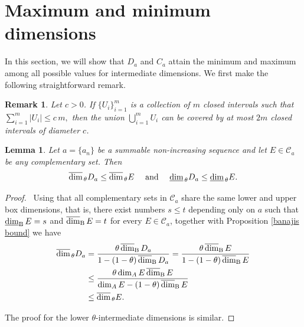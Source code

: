 \documentclass[11pt,reqno,bookmarksnumbered,raiselinks,breaklinks,colorlinks,plainpages]{amsart}
\newcommand\ubd{\overline{\mbox{\rm dim}}_{\rm B}\,} %
\newcommand\lbd{\underline{\mbox{\rm dim}}_{\rm B}\,} %
\newcommand\da{\underline{\mbox{\rm dim}}_{\,\theta}} %
\newcommand\uda{\overline{\mbox{\rm dim}}_{\,\theta}} %
\newtheorem{lem}[theo]{Lemma}
\newtheorem{rmk}[theo]{Remark}
\begin{document}
\section{Maximum and minimum dimensions}

In this section, we will show that \( D_{a} \) and \( C_{a} \) attain the minimum and maximum among all possible values for intermediate dimensions. We first make the following straightforward remark.


\begin{rmk}\label{lemma cubrimiento}
Let $c > 0$. If $\{U_i\}_{i=1}^{m}$ is a collection of $m$ closed intervals such that \(
\sum_{i=1}^{m} |U_i| \leq c \, m,\)
then the union $\bigcup_{i=1}^{m} U_i$ can be covered by at most $2m$ closed intervals of diameter $c$.
\end{rmk}

\begin{lem}
    Let $a=\{a_n\}$ be a summable non-increasing sequence and let $E\in \mathcal{C}_a$ be any complementary set. Then 
    $$\uda D_{a} \leq \uda E \quad\text{ and }\quad \da D_{a} \leq \da E.$$ 
\end{lem}
\begin{proof}\
     Using that all complementary sets in $\mathcal{C}_a$ share the same lower and upper box dimensions, that is, there exist numbers $s \leq t$ depending only on $a$ such that $\lbd E = s$ and $\ubd E = t$ for every $E \in \mathcal{C}_a$, together with Proposition \ref{banajis bound}
 we have
 \begin{align*}
     \uda D_a &=\frac{\theta\, \ubd D_a}{1-(1-\theta)\,\ubd D_a}
     = \frac{\theta \, \ubd E}{1 -(1-\theta)\,\ubd E}\\
     &\leq \frac{\theta\dim_A E \,\ubd E  }{\dim_A E-(1-\theta)\,\ubd E}\\
     &\leq \uda E.
 \end{align*}

 The proof for the lower $\theta$-intermediate dimensions is similar.
 \end{proof}
\end{document}

